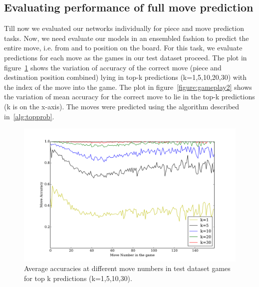 \subsection{Evaluating performance of full move prediction}
Till now we evaluated our networks individually for piece and move prediction 
tasks. Now, we need evaluate our models in an ensembled fashion to predict the 
entire move, i.e. from and to position on the board. For this task, we evaluate 
predictions for each move as the games in our test dataset proceed. The 
plot in figure~\ref{figure:gameplay1} shows the variation of accuracy of the 
correct move (piece and destination position combined) lying in top-k 
predictions (k=1,5,10,20,30) with the index of the move into the game. The plot 
in figure~\ref{figure:gameplay2} shows the variation of mean accuracy for the 
correct move to lie in the top-k predictions (k is on the x-axis). The moves 
were predicted using the algorithm described in~\ref{alg:topprob}.
\vspace*{-1.5in}
\begin{figure}[H]
\includegraphics[width=1.3\textwidth,center]{plots/accuracy_new.pdf}
\caption[Variation of accuracies with move number]{Average accuracies at 
different move numbers in test dataset games for top k 
predictions (k=1,5,10,30).}
\label{figure:gameplay1}
\end{figure}
